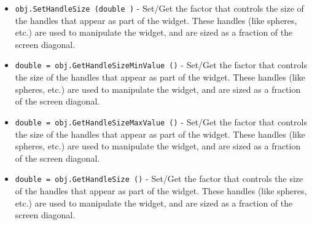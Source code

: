 \begin{itemize}
\item  \verb|obj.SetHandleSize (double )| -  Set/Get the factor that controls the size of the handles that
 appear as part of the widget. These handles (like spheres, etc.)
 are used to manipulate the widget, and are sized as a fraction of
 the screen diagonal.

\item  \verb|double = obj.GetHandleSizeMinValue ()| -  Set/Get the factor that controls the size of the handles that
 appear as part of the widget. These handles (like spheres, etc.)
 are used to manipulate the widget, and are sized as a fraction of
 the screen diagonal.

\item  \verb|double = obj.GetHandleSizeMaxValue ()| -  Set/Get the factor that controls the size of the handles that
 appear as part of the widget. These handles (like spheres, etc.)
 are used to manipulate the widget, and are sized as a fraction of
 the screen diagonal.

\item  \verb|double = obj.GetHandleSize ()| -  Set/Get the factor that controls the size of the handles that
 appear as part of the widget. These handles (like spheres, etc.)
 are used to manipulate the widget, and are sized as a fraction of
 the screen diagonal.

\end{itemize}
